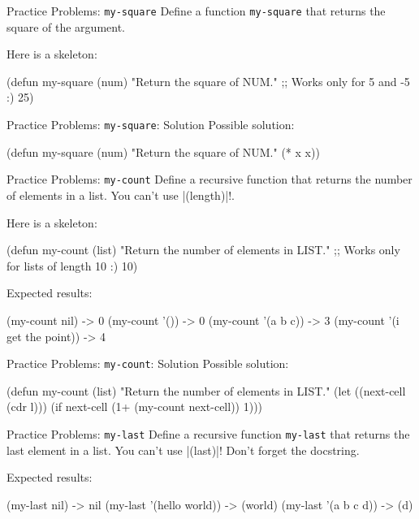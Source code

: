 \documentclass{beamer}
\begin{document}
\begin{frame}[fragile]{Practice Problems: \texttt{my-square}}
  Define a function \texttt{my-square} that returns the square of the argument.

  Here is a skeleton:
  \begin{clcode}
(defun my-square (num)
  "Return the square of NUM."
  ;; Works only for 5 and -5 :)
  25)
  \end{clcode}
\end{frame}

\begin{frame}[fragile]{Practice Problems: \texttt{my-square}: Solution}
  Possible solution:
  \begin{clcode}
(defun my-square (num)
  "Return the square of NUM."
  (* x x))
  \end{clcode}
\end{frame}

\begin{frame}[fragile]{Practice Problems: \texttt{my-count}}
  Define a recursive function that returns the number of elements in a list. You can't use \cl|(length)|!.

Here is a skeleton:
\begin{clcode}
(defun my-count (list)
  "Return the number of elements in LIST."
  ;; Works only for lists of length 10 :)
  10)
\end{clcode}

Expected results:
\begin{clcode}
  (my-count nil) -> 0
  (my-count '()) -> 0
  (my-count '(a b c)) -> 3
  (my-count '(i get the point)) -> 4
\end{clcode}
\end{frame}

\begin{frame}[fragile]{Practice Problems: \texttt{my-count}: Solution}
Possible solution:
  \begin{clcode}
(defun my-count (list)
  "Return the number of elements in LIST."
  (let ((next-cell (cdr l)))
    (if next-cell
        (1+ (my-count next-cell))
      1)))
  \end{clcode}
\end{frame}

\begin{frame}[fragile]{Practice Problems: \texttt{my-last}}
Define a recursive function \texttt{my-last} that returns the last element in a list. You can't use \cl|(last)|! Don't forget the docstring.

Expected results:
\begin{clcode}
  (my-last nil) -> nil
  (my-last '(hello world)) -> (world)
  (my-last '(a b c d)) -> (d)
\end{clcode}
\end{frame}
\end{document}
